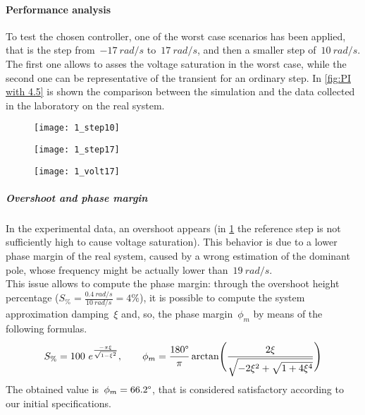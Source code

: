 \paragraph{Performance analysis}
To test the chosen controller, one of the worst case scenarios has been applied, that is the step from~$-17\ rad/s$ to~$17\ rad/s$, and then a smaller step of~$10\ rad/s$. The first one allows to asses the voltage saturation in the worst case, while the second one can be representative of the transient for an ordinary step.
In \cref{fig:PI with 4.5} is shown the comparison between the simulation and the data collected in the laboratory on the real system.
\begin{figure*}[h]
	\centering
	\begin{subfigure}{0.45\columnwidth}
		\texttt{[image: 1\_step10]}
		\label{fig:PI with 4.5 step 10}
	\end{subfigure}
	\begin{subfigure}{0.45\columnwidth}
		\texttt{[image: 1\_step17]}
	\end{subfigure}
	\newline
	\begin{subfigure}{0.45\columnwidth}
		\texttt{[image: 1\_volt17]}
	\end{subfigure}
	\caption{Speed control loop with $k_{v}=4.5$}
	\label{fig:PI with 4.5}
\end{figure*}
\subparagraph{Overshoot and phase margin}
In the experimental data, an overshoot appears (in \cref{fig:PI with 4.5 step 10} the reference step is not sufficiently high to cause voltage saturation). This behavior is due to a lower phase margin of the real system, caused by a wrong estimation of the dominant pole, whose frequency might be actually lower than~$19\ rad/s$. \\
This issue allows to compute the phase margin: through the overshoot height percentage ($S_\% = \frac{0.4\ rad/s}{10\ rad/s} = 4\%$), it is possible to compute the system approximation damping~$\xi$ and, so, the phase margin~$\phi_m$ by means of the following formulas.
\begin{equation}
	S_\% = 100\ e^{\frac{-\pi\xi}{\sqrt{1-\xi^2}}} ,
	\qquad
	\phi_m = \frac{180\degree}{\pi} \arctan \Biggl( \frac{2\xi}{\sqrt{-2\xi^2 + \sqrt{1+4\xi^4} }} \Biggr)
	\label{eq:phase_margin_compute}
\end{equation}
The obtained value is~$\phi_m = 66.2 \degree$, that is considered satisfactory according to our initial specifications.

